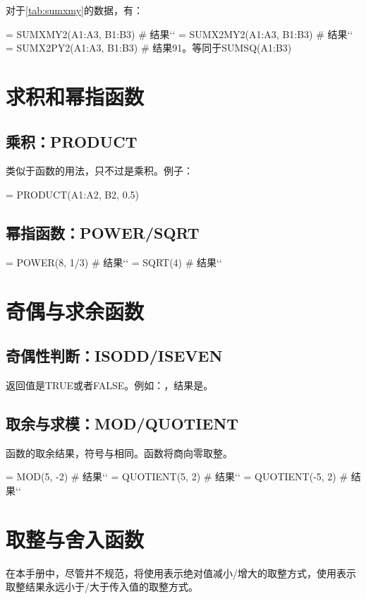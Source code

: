 对于\autoref{tab:sumxmy}的数据，有：
\begin{excode}
= SUMXMY2(A1:A3, B1:B3)  # 结果``
= SUMX2MY2(A1:A3, B1:B3)  # 结果``
= SUMX2PY2(A1:A3, B1:B3)  # 结果91。等同于SUMSQ(A1:B3)
\end{excode}

\section{求积和幂指函数}
\subsection{乘积：PRODUCT}
类似于函数的用法，只不过是乘积。例子：
\begin{excode}
= PRODUCT(A1:A2, B2, 0.5)
\end{excode}

\subsection{幂指函数：POWER/SQRT}
\begin{excode}
= POWER(8, 1/3)  # 结果``
= SQRT(4)  # 结果``
\end{excode}

\section{奇偶与求余函数}
\subsection{奇偶性判断：ISODD/ISEVEN}
返回值是TRUE或者FALSE。例如：，结果是。

\subsection{取余与求模：MOD/QUOTIENT}
函数的取余结果，符号与相同。函数将商向零取整。
\begin{excode}
= MOD(5, -2)  # 结果`` 
= QUOTIENT(5, 2)  # 结果``
= QUOTIENT(-5, 2)  # 结果``
\end{excode}

\section{取整与舍入函数}
在本手册中，尽管并不规范，将使用表示绝对值减小/增大的取整方式，使用表示取整结果永远小于/大于传入值的取整方式。

